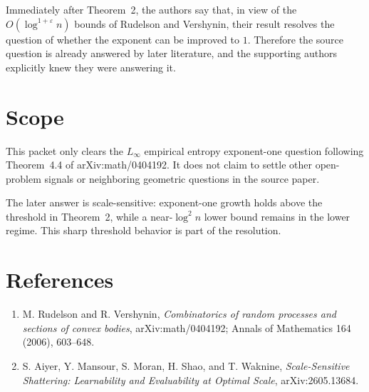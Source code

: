 \documentclass[11pt]{article}
\begin{document}
Immediately after Theorem~2, the authors say that, in view of the
$O(\log^{1+\varepsilon}n)$ bounds of Rudelson and Vershynin, their result
resolves the question of whether the exponent can be improved to $1$.
Therefore the source question is already answered by later literature, and the
supporting authors explicitly knew they were answering it.

\section*{Scope}

This packet only clears the $L_\infty$ empirical entropy exponent-one question
following Theorem~4.4 of arXiv:math/0404192. It does not claim to settle other
open-problem signals or neighboring geometric questions in the source paper.

The later answer is scale-sensitive: exponent-one growth holds above the
threshold in Theorem~2, while a near-$\log^2 n$ lower bound remains in the
lower regime. This sharp threshold behavior is part of the resolution.

\section*{References}

\begin{enumerate}
\item M. Rudelson and R. Vershynin,
\emph{Combinatorics of random processes and sections of convex bodies},
arXiv:math/0404192; Annals of Mathematics 164 (2006), 603--648.
\item S. Aiyer, Y. Mansour, S. Moran, H. Shao, and T. Waknine,
\emph{Scale-Sensitive Shattering: Learnability and Evaluability at Optimal
Scale}, arXiv:2605.13684.
\end{enumerate}
\end{document}
